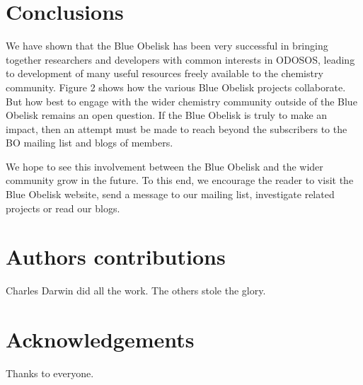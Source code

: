 \documentclass[10pt]{bmc_article}
\newenvironment{bmcformat}{\fussy\setboolean{publ}{true}}{\fussy}
\begin{document}
\begin{bmcformat}
\section*{Conclusions}

We have shown that the Blue Obelisk has been very successful
in bringing together researchers and developers with common interests
in ODOSOS, leading to development of many useful resources freely
available to the chemistry community. Figure 2 shows how the various
Blue Obelisk projects collaborate. But how best to engage with the
wider chemistry community outside of the Blue Obelisk remains an open
question. If the Blue Obelisk is truly to make an impact,
then an attempt must be made to reach beyond the subscribers to the
BO mailing list and blogs of members.

We hope to see this involvement between the Blue Obelisk and the wider
community grow in the future. To this end, we encourage the reader to
visit the Blue Obelisk website\cite{WebBlueObelisk}, send a message to our mailing list,
investigate related projects or read our blogs.


\section*{Authors contributions}
   Charles Darwin did all the work. The others stole the glory.


\section*{Acknowledgements}
  Thanks to everyone.






\end{bmcformat}
\end{document}
